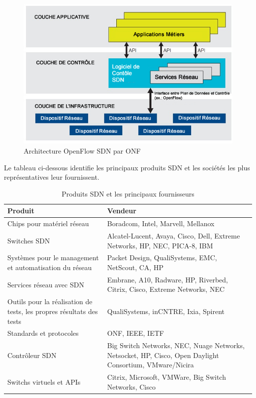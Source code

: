 \begin{figure}[!h] %
\includegraphics[width=15cm]{images/openflowArchi.jpg} %
\caption{ Architecture OpenFlow SDN par ONF \cite{SDNNewNormONFExecutiveSummary}} %
\label{imgArchi} %
\end{figure} %
 
Le tableau ci-dessous identifie les principaux produits SDN et les sociétés les plus représentatives leur fournissent.

\begin{table}[!h]
\centering
\begin{tabular}{|p{6cm}|p{9cm}|}
\hline 
\bf Produit & \bf Vendeur \\ 
\hline 
Chips pour matériel réseau & Boradcom, Intel, Marvell, Mellanox \\ 
\hline 
Switches SDN & Alcatel-Lucent, Avaya, Cisco, Dell, Extreme Networks, HP, NEC, PICA-8, IBM \\ 
\hline 
Systèmes pour le management et automatisation du réseau & Packet Design, QualiSystems, EMC, NetScout, CA, HP \\ 
\hline 
Services réseau avec SDN & Embrane, A10, Radware, HP, Riverbed, Citrix, Cisco,  Extreme Networks, NEC \\ 
\hline 
Outils pour la réalisation de tests, les propres résultats des tests & QualiSystems, inCNTRE, Ixia, Spirent \\ 
\hline 
Standards et protocoles & ONF, IEEE, IETF \\ 
\hline 
Contrôleur SDN & Big Switch Networks, NEC, Nuage Networks, Netsocket, HP, Cisco, Open Daylight Consortium, VMware/Nicira \\ 
\hline 
Switchs virtuels et APIs & Citrix, Microsoft, VMWare, Big Switch Networks, Cisco \\ 
\hline 
\end{tabular} 
\caption{Produits SDN et les principaux fournisseurs \cite{2013GuideSDNNVEcosystem}}
\end{table} 
 
